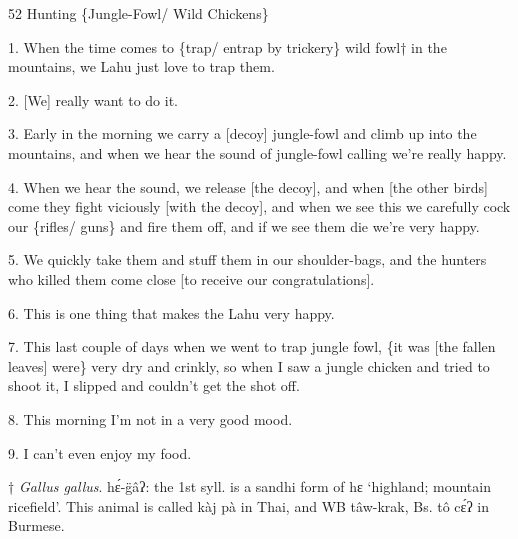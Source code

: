 
52 Hunting \{Jungle-Fowl/ Wild Chickens\}

1. When the time comes to \{trap/ entrap by trickery\} wild fowl† in the mountains,
we Lahu just love to trap them.

2. [We] really want to do it.

3. Early in the morning we carry a [decoy] jungle-fowl and climb up into the mountains,
and when we hear the sound of jungle-fowl calling we're really happy.

4. When we hear the sound, we release [the decoy], and when [the other birds] come
they fight viciously [with the decoy], and when we see this we carefully cock our
\{rifles/ guns\} and fire them off, and if we see them die we're very happy.

5. We quickly take them and stuff them in our shoulder-bags, and the hunters who
killed them come close [to receive our congratulations].

6. This is one thing that makes the Lahu very happy.

7. This last couple of days when we went to trap jungle fowl, \{it was [the fallen
leaves] were\} very dry and crinkly, so when I saw a jungle chicken and tried to
shoot it, I slipped and couldn't get the shot off.

8. This morning I'm not in a very good mood.

9. I can't even enjoy my food.

† \textit{Gallus gallus}. hɛ́-g̈âʔ: the 1st syll. is a sandhi form of hɛ
`highland; mountain ricefield'.  This animal is called kàj pà in Thai, and WB
tâw-krak, Bs. tô cɛ́ʔ in Burmese.


